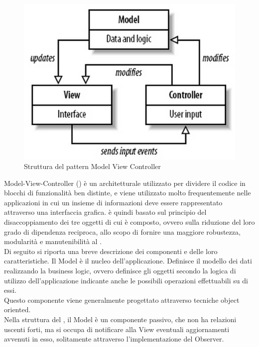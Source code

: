  \label{app:designpattern}
	 \label{app:MVC}
	\begin{figure}[H]\centering
    \includegraphics[scale=0.7]{SpecificaTecnica/Pics/MVC}
    \caption{Struttura del pattern Model View Controller}
	\end{figure}
	Model-View-Controller () è un  architetturale utilizzato per dividere il codice in blocchi di funzionalità ben distinte, e viene utilizzato molto frequentemente nelle applicazioni in cui un insieme di informazioni deve essere rappresentato attraverso una interfaccia grafica.
		 è quindi basato sul principio del disaccoppiamento dei tre oggetti di cui è composto, ovvero sulla riduzione del loro grado di dipendenza reciproca, allo scopo di fornire una maggiore robustezza, modularità e manutenibilità al .\\
		Di seguito si riporta una breve descrizione dei componenti e delle loro caratteristiche. 
			Il Model è il nucleo dell'applicazione. Definisce il modello dei dati realizzando la business logic, ovvero definisce gli oggetti secondo la logica di utilizzo dell'applicazione indicante anche le possibili operazioni effettuabili su di essi.\\
			Questo componente viene generalmente progettato attraverso tecniche object oriented.\\
			Nella struttura del  , il Model è un componente passivo, che non ha relazioni uscenti forti, ma si occupa di notificare alla View eventuali aggiornamenti avvenuti in esso, solitamente attraverso l'implementazione del  Observer.
